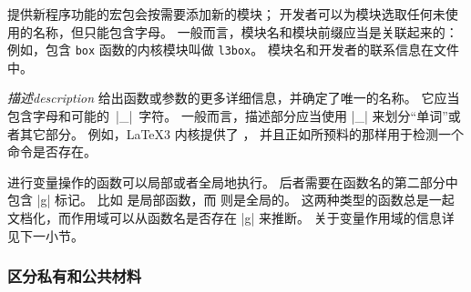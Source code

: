 \documentclass[full]{l3doc}
\begin{document}
提供新程序功能的宏包会按需要添加新的模块；
开发者可以为模块选取任何未使用的名称，但只能包含字母。
一般而言，模块名和模块前缀应当是关联起来的：
例如，包含 \texttt{box} 函数的内核模块叫做 \texttt{l3box}。
模块名和开发者的联系信息在文件  中。

%

\emph{描述description} 给出函数或参数的更多详细信息，并确定了唯一的名称。
它应当包含字母和可能的~|_|~字符。
一般而言，描述部分应当使用 |_| 来划分“单词”或者其它部分。
例如，\LaTeX3 内核提供了 ，
并且正如所预料的那样用于检测一个命令是否存在。

%

进行变量操作的函数可以局部或者全局地执行。
后者需要在函数名的第二部分中包含 |g| 标记。
比如  是局部函数，而  则是全局的。
这两种类型的函数总是一起文档化，而作用域可以从函数名是否存在 |g| 来推断。
关于变量作用域的信息详见下一小节。

\subsubsection{区分私有和公共材料}

%
%
\end{document}
